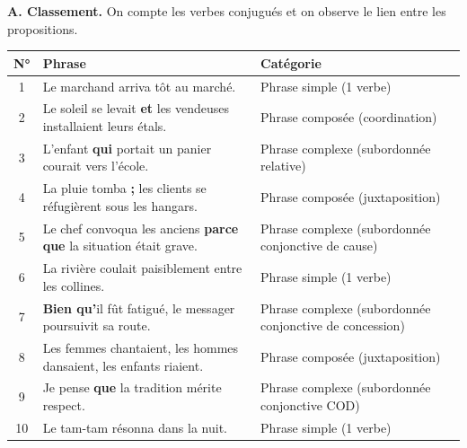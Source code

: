 \documentclass[11pt]{article}
\begin{document}
\begin{corrige}
\textbf{A. Classement.} On compte les verbes conjugués et on observe le lien entre les propositions.

\begin{center}
\begin{tabularx}{\linewidth}{|c|X|l|}
\hline
\rowcolor{popblueL} N° & Phrase & Catégorie \\
\hline
1 & Le marchand arriva tôt au marché. & Phrase simple (1 verbe) \\
\hline
2 & Le soleil se levait \textbf{et} les vendeuses installaient leurs étals. & Phrase composée (coordination) \\
\hline
3 & L'enfant \textbf{qui} portait un panier courait vers l'école. & Phrase complexe (subordonnée relative) \\
\hline
4 & La pluie tomba \textbf{;} les clients se réfugièrent sous les hangars. & Phrase composée (juxtaposition) \\
\hline
5 & Le chef convoqua les anciens \textbf{parce que} la situation était grave. & Phrase complexe (subordonnée conjonctive de cause) \\
\hline
6 & La rivière coulait paisiblement entre les collines. & Phrase simple (1 verbe) \\
\hline
7 & \textbf{Bien qu'}il fût fatigué, le messager poursuivit sa route. & Phrase complexe (subordonnée conjonctive de concession) \\
\hline
8 & Les femmes chantaient, les hommes dansaient, les enfants riaient. & Phrase composée (juxtaposition) \\
\hline
9 & Je pense \textbf{que} la tradition mérite respect. & Phrase complexe (subordonnée conjonctive COD) \\
\hline
10 & Le tam-tam résonna dans la nuit. & Phrase simple (1 verbe) \\
\hline
\end{tabularx}
\end{center}


\end{corrige}
\end{document}
